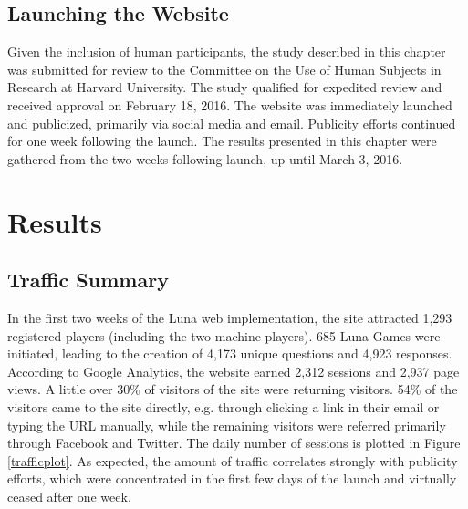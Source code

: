 \subsection{Launching the Website}

Given the inclusion of human participants, the study described in this chapter was submitted for review to the Committee on the Use of Human Subjects in Research at Harvard University. The study qualified for expedited review and received approval on February 18, 2016. The website was immediately launched and publicized, primarily via social media and email. Publicity efforts continued for one week following the launch. The results presented in this chapter were gathered from the two weeks following launch, up until March 3, 2016. 

\section{Results}

\subsection{Traffic Summary}

In the first two weeks of the Luna web implementation, the site attracted 1,293 registered players (including the two machine players). 685 Luna Games were initiated, leading to the creation of 4,173 unique questions and 4,923 responses. According to Google Analytics, the website earned 2,312 sessions and 2,937 page views. A little over 30\% of visitors of the site were returning visitors. 54\% of the visitors came to the site directly, e.g. through clicking a link in their email or typing the URL manually, while the remaining visitors were referred primarily through Facebook and Twitter. The daily number of sessions is plotted in Figure \ref{trafficplot}. As expected, the amount of traffic correlates strongly with publicity efforts, which were concentrated in the first few days of the launch and virtually ceased after one week.

